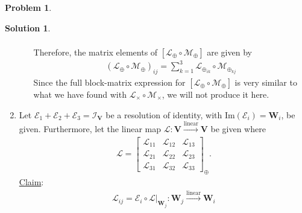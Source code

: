 \documentclass{book}
\theoremstyle{definition}
\newtheorem*{prob*}{Problem}
\newtheorem*{sln*}{Solution}
\newcommand{\V}{\mathbf{V}}
\newcommand{\W}{\mathbf{W}}
\newcommand{\lag}{\mathcal{L}}
\newcommand{\M}{\mathcal{M}}
\newcommand{\E}{\mathcal{E}}
\newcommand{\ima}{\text{Im}}
\newcommand{\lin}{\overset{\text{linear}}{\longrightarrow}}
\begin{document}
\begin{prob*}
\begin{sln*}
\begin{enumerate}
\begin{enumerate}
\begin{align*}
				\end{align*}
				Therefore, the matrix elements of $[\lag_\oplus\circ \M_\oplus]$ are given by
				\begin{align*}
				\boxed{(\lag_\oplus\circ\M_\oplus)_{ij} = \sum^3_{k=1}\lag_{\oplus_{ik}}\circ\M_{\oplus_{kj}}}
				\end{align*}
				Since the full block-matrix expression for $[\lag_\oplus\circ \M_\oplus]$ is very similar to what we have found with $\lag_\times \circ \M_\times$, we will not produce it here.
			\end{enumerate}
			
			
			
			
			
			
			
			
			\newpage
			
			
			
		
			
			
			
			
			
			\item Let $\E_1 + \E_2 + \E_3 = \mathcal{I}_\V$ be a resolution of identity, with $\ima(\E_i) = \W_i$, be given. Furthermore, let the linear map $\lag : \V \lin \V$ be given where
			\begin{align*}
			\lag = \begin{bmatrix}
			\lag_{11} & \lag_{12} & \lag_{13}\\
			\lag_{21} & \lag_{22} & \lag_{23}\\
			\lag_{31} & \lag_{32} & \lag_{33}
			\end{bmatrix}_\oplus.
			\end{align*} 
			\underline{Claim}: 
			\begin{align*}
			\boxed{\lag_{ij} =  \E_{i} \circ \lag\bigg\vert_{\W_j} : \W_j \lin \W_i}
			\end{align*}
			

\end{enumerate}
\end{sln*}
\end{prob*}
\end{document}
